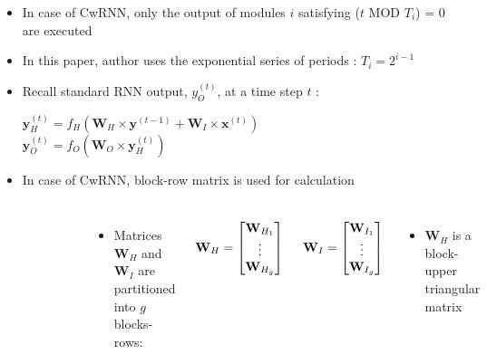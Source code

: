 \documentclass{beamer}
\begin{document}
\frame
{
	\begin{itemize}
		\item In case of CwRNN, only the output of modules ${i}$ satisfying (${t}$ MOD ${T_i}$) = 0 are executed		
		\item In this paper, author uses the exponential series of periods : ${T_i = 2^{i-1} }$
		\item Recall standard RNN output, ${y_O^{(t)}}$, at a time step ${t}$ : \\
		\begin{center}
			${ \mathbf{y}_H^{(t)} = f_H ( \mathbf{W}_H\times \mathbf{y}^{(t-1)} + \mathbf{W}_I\times \mathbf{x}^{(t)}) }$ \\
			${ \mathbf{y}_O^{(t)} = f_O ( \mathbf{W}_O \times \mathbf{y}_H^{(t)} ) }$
		\end{center}			
		\item In case of CwRNN, block-row matrix is used for calculation
	\end{itemize}	
}
\frame
{
	\begin{columns}
	\begin{figure}[ht]  
		\begin{center}
			\includegraphics[width=2.1in]{Images/cwrnn_calculation.png}   
		\end{center}   
	\end{figure}	
						
	\begin{itemize}
		\item Matrices ${\mathbf{W}_H}$ and ${\mathbf{W}_I}$ are partitioned into ${g}$ blocks-rows: 
	\end{itemize}	
	\[
	\mathbf{W}_H=
  \begin{bmatrix}
    \mathbf{W}_{H_1} \\
    \vdots \\
    \mathbf{W}_{H_g} 
  \end{bmatrix}
  \hspace{0.5cm}
  \mathbf{W}_I=
  \begin{bmatrix}
    \mathbf{W}_{I_1} \\
    \vdots \\
    \mathbf{W}_{I_g} 
  \end{bmatrix}
\]
  	\begin{itemize}
  		\item ${ \mathbf{W}_H }$ is a block-upper triangular matrix
  	\end{itemize}
  	
	\end{columns}
}
\end{document}
